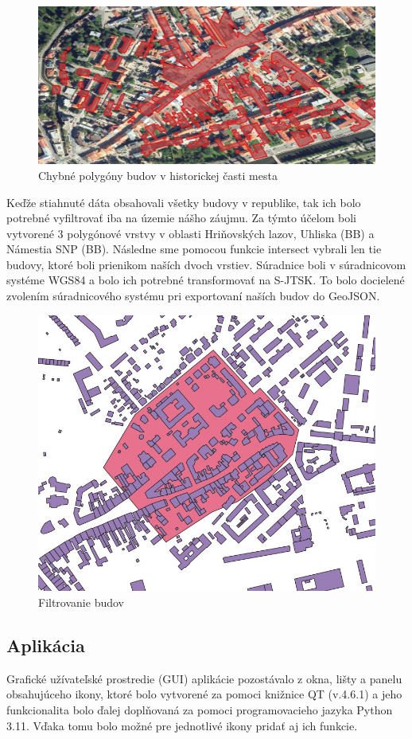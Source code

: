 \documentclass[12pt]{article}
\begin{document}
\begin{figure}[h]
    \centering
    \includegraphics[width=0.7\linewidth]{latex/image/chyba.jpg}
    \caption{Chybné polygóny budov v historickej časti mesta}
    \label{fig:enter-label}
\end{figure}\par
Keďže stiahnuté dáta obsahovali všetky budovy v republike, tak ich bolo potrebné vyfiltrovať iba na územie nášho záujmu. Za týmto účelom boli vytvorené 3 polygónové vrstvy v oblasti Hriňovských lazov, Uhliska (BB) a Námestia SNP (BB). Následne sme pomocou funkcie intersect vybrali len tie budovy, ktoré boli prienikom naších dvoch vrstiev. Súradnice boli v súradnicovom systéme WGS84 a bolo ich potrebné transformovať na S-JTSK. To bolo docielené zvolením súradnicového systému pri exportovaní naších budov do GeoJSON.
\begin{figure}[h]
    \centering
    \includegraphics[width=0.7\linewidth]{latex/image/filter.jpg}
    \caption{Filtrovanie budov}
    \label{fig:enter-label}
\end{figure}
\newpage
\subsection*{Aplikácia}
Grafické užívateľské prostredie (GUI) aplikácie  pozostávalo z okna, lišty a panelu obsahujúceho ikony, ktoré bolo vytvorené za pomoci knižnice QT (v.4.6.1) a jeho funkcionalita bolo ďalej doplňovaná za pomoci programovacieho jazyka Python 3.11. Vďaka tomu bolo možné pre jednotlivé ikony pridať aj ich funkcie.
\end{document}
